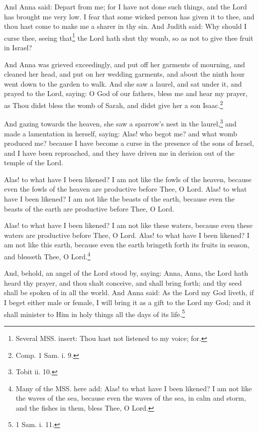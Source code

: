 \pend\pstart
And Anna said: Depart from me; for I have not done such things, and the Lord has brought me very low. I fear that some wicked person has given it to thee, and thou hast come to make me a sharer in thy sin. And Judith said: Why should I curse thee, seeing that\footnote{Several MSS. insert: Thou hast not listened to my voice; for.} the Lord hath shut thy womb, so as not to give thee fruit in Israel?

\pend\pstart
And Anna was grieved exceedingly, and put off her garments of mourning, and cleaned her head, and put on her wedding garments, and about the ninth hour went down to the garden to walk. And she saw a laurel, and sat under it, and prayed to the Lord, saying: O God of our fathers, bless me and hear my prayer, as Thou didst bless the womb of Sarah, and didst give her a son Isaac.\footnote{Comp. 1 Sam. i. 9.}

\pend\pstart
{}

\pend\pstart
And gazing towards the heaven, she saw a sparrow's nest in the laurel,\footnote{Tobit ii. 10.} and made a lamentation in herself, saying: Alas! who begot me? and what womb produced me? because I have become a curse in the presence of the sons of Israel, and I have been reproached, and they have driven me in derision out of the temple of the Lord.

\pend\pstart
Alas! to what have I been likened? I am not like the fowls of the heaven, because even the fowls of the heaven are productive before Thee, O Lord. Alas! to what have I been likened? I am not like the beasts of the earth, because even the beasts of the earth are productive before Thee, O Lord.

\pend\pstart
Alas! to what have I been likened? I am not like these waters, because even these waters are productive before Thee, O Lord. Alas! to what have I been likened? I am not like this earth, because even the earth bringeth forth its fruits in season, and blesseth Thee, O Lord.\footnote{Many of the MSS. here add: Alas! to what have I been likened? I am not like the waves of the sea, because even the waves of the sea, in calm and storm, and the fishes in them, bless Thee, O Lord.}

\pend\pstart
{}

\pend\pstart
And, behold, an angel of the Lord stood by, saying: Anna, Anna, the Lord hath heard thy prayer, and thou shalt conceive, and shall bring forth; and thy seed shall be spoken of in all the world. And Anna said: As the Lord my God liveth, if I beget either male or female, I will bring it as a gift to the Lord my God; and it shall minister to Him in holy things all the days of its life.\footnote{1 Sam. i. 11.}

